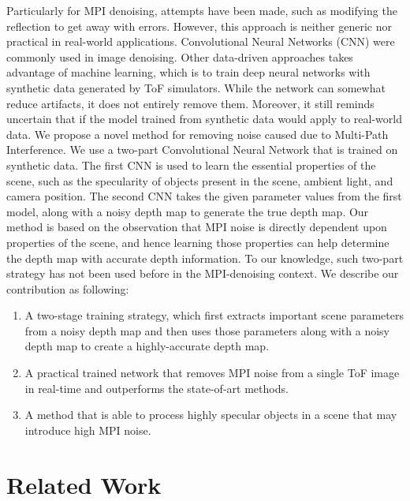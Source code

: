 \documentclass[runningheads]{llncs}
\begin{document}
Particularly for MPI denoising, attempts have been made, such as modifying the reflection to get away with errors. 
However, this approach is neither generic nor practical in real-world applications. 
Convolutional Neural Networks (CNN) were commonly used in image denoising. 
Other data-driven approaches \cite{bolsee2018cnn,marco2017deeptof} takes advantage of machine learning, which is to train deep neural networks with synthetic data generated by ToF simulators. 
While the network can somewhat reduce artifacts, it does not entirely remove them. 
Moreover, it still reminds uncertain that if the model trained from synthetic data would apply to real-world data. 
\newline
\newline
We propose a novel method for removing noise caused due to Multi-Path Interference. We use a two-part Convolutional Neural Network that is trained on synthetic data. The first CNN is used to learn the essential properties of the scene, such as the specularity of objects present in the scene, ambient light, and camera position. The second CNN takes the given parameter values from the first model, along with a noisy depth map to generate the true depth map. Our method is based on the observation that MPI noise is directly dependent upon properties of the scene, and hence learning those properties can help determine the depth map with accurate depth information. To our knowledge, such two-part strategy has not been used before in the MPI-denoising context. 
\newline
\newline
We describe our contribution as following: 
\begin{enumerate}
    \item A two-stage training strategy, which first extracts important scene parameters from a noisy depth map and then uses those parameters along with a noisy depth map to create a highly-accurate depth map.  
    \item A practical trained network that removes MPI noise from a single ToF image in real-time and outperforms the state-of-art methods.
    \item A method that is able to process highly specular objects in a scene that may introduce high MPI noise.
\end{enumerate}


\section{Related Work}
\end{document}
